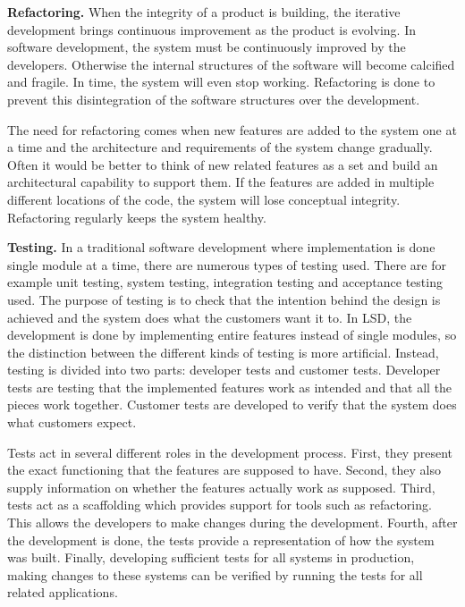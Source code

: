 \textbf{Refactoring.} When the integrity of a product is building, the iterative development brings continuous improvement as the product is evolving. In software development, the system must be continuously improved by the developers. Otherwise the internal structures of the software will become calcified and fragile. In time, the system will even stop working. Refactoring is done to prevent this disintegration of the software structures over the development.

The need for refactoring comes when new features are added to the system one at a time and the architecture and requirements of the system change gradually. Often it would be better to think of new related features as a set and build an architectural capability to support them. If the features are added in multiple different locations of the code, the system will lose conceptual integrity. Refactoring regularly keeps the system healthy.


\textbf{Testing.} In a traditional software development where implementation is done single module at a time, there are numerous types of testing used. There are for example unit testing, system testing, integration testing and acceptance testing used. The purpose of testing is to check that the intention behind the design is achieved and the system does what the customers want it to. In LSD, the development is done by implementing entire features instead of single modules, so the distinction between the different kinds of testing is more artificial. Instead, testing is divided into two parts: developer tests and customer tests. Developer tests are testing that the implemented features work as intended and that all the pieces work together. Customer tests are developed to verify that the system does what customers expect.

Tests act in several different roles in the development process. First, they present the exact functioning that the features are supposed to have. Second, they also supply information on whether the features actually work as supposed. Third, tests act as a scaffolding which provides support for tools such as refactoring. This allows the developers to make changes during the development. Fourth, after the development is done, the tests provide a representation of how the system was built. Finally, developing sufficient tests for all systems in production, making changes to these systems can be verified by running the tests for all related applications.

